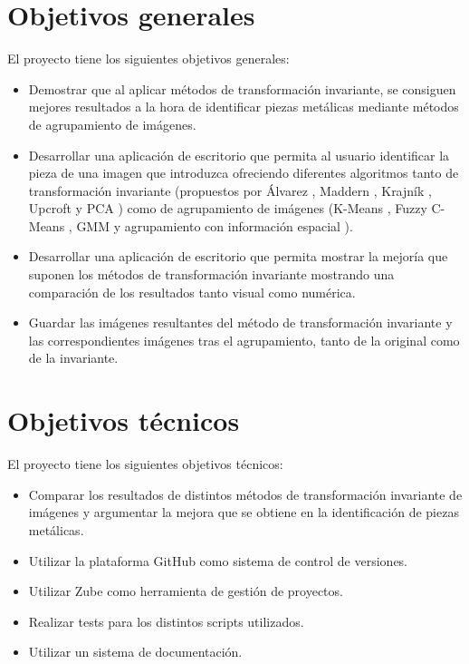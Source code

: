 
\section{Objetivos generales}\label{objetivos-generales}

El proyecto tiene los siguientes objetivos generales:

\begin{itemize}
    \tightlist
        \item
            Demostrar que al aplicar métodos de transformación invariante, se consiguen mejores resultados a la hora de identificar piezas metálicas mediante métodos de agrupamiento de imágenes.
        \item
            Desarrollar una aplicación de escritorio que permita al usuario identificar la pieza de una imagen que introduzca ofreciendo diferentes algoritmos tanto de transformación invariante (propuestos por Álvarez \cite{alvarez2011}, Maddern \cite{maddern2014}, Krajník \cite{krajník2015}, Upcroft \cite{upcroft2014} y PCA \cite{pca2017}) como de agrupamiento de imágenes (K-Means \cite{MATLAB:2023bKmeans}, Fuzzy C-Means \cite{MATLAB:2023bFuzzy}, GMM \cite{MATLAB:2023bGMM} y agrupamiento con información espacial \cite{wang2012hmrf}).
        \item
            Desarrollar una aplicación de escritorio que permita mostrar la mejoría que suponen los métodos de transformación invariante mostrando una comparación de los resultados tanto visual como numérica.
        \item
            Guardar las imágenes resultantes del método de transformación invariante y las correspondientes imágenes tras el agrupamiento, tanto de la original como de la invariante.
\end{itemize}

\section{Objetivos técnicos}\label{objetivos-tecnicos}

El proyecto tiene los siguientes objetivos técnicos:

\begin{itemize}
    \tightlist
        \item
            Comparar los resultados de distintos métodos de transformación invariante de imágenes y argumentar la mejora que se obtiene en la identificación de piezas metálicas.
        \item
            Utilizar la plataforma GitHub como sistema de control de versiones.
        \item
            Utilizar Zube como herramienta de gestión de proyectos.
        \item
            Realizar tests para los distintos scripts utilizados.
        \item
            Utilizar un sistema de documentación.
\end{itemize}

